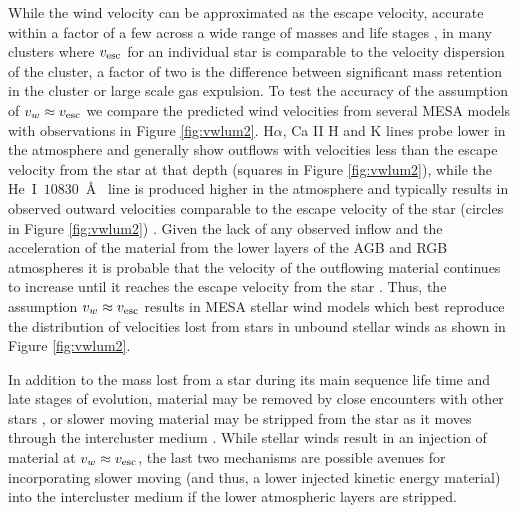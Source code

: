 \documentclass[fleqn,usenatbib]{mnras}
\begin{document}
While the wind velocity can be approximated as the escape velocity, accurate within a factor of a few across a wide range of masses and life stages \citep{abbott1978,evans2004,schaerer1996,nyman1992,vass1993,loup1993,dupree1987,debes2006,badalyan1992}, in many clusters where $v_{\rm esc}$ for an individual star is comparable to the velocity dispersion of the cluster, a factor of two is the difference between significant mass retention in the cluster or large scale gas expulsion.
To test the accuracy of the assumption of $v_w \approx v_{\rm esc}$ we compare the predicted wind velocities from several MESA models with observations 
in Figure \ref{fig:vwlum2}.
H$\alpha$, Ca II H and K lines probe lower in the atmosphere and generally show outflows with velocities less than the escape velocity from the star at 
that depth (squares in Figure \ref{fig:vwlum2}), while the He~I~$10830$~\AA~ line is produced higher in the atmosphere and typically results in observed outward velocities comparable to the escape velocity of the star (circles in Figure \ref{fig:vwlum2}) \citep{dupree1992a,mauas2006,mcdonald2007,dupree2009,meszaros2009,smith2004}.
Given the lack of any observed inflow and the acceleration of the material from the lower layers of the AGB and RGB atmospheres it is probable that the velocity of the outflowing material continues to increase until it reaches the escape velocity from the star \citep{mauas2006}.
Thus, the assumption $v_w \approx v_{\rm esc}$ results in MESA stellar wind models which best reproduce the distribution of velocities lost from stars in unbound stellar winds as shown in Figure \ref{fig:vwlum2}.

 In addition to the mass lost from a star during its main sequence life time and late stages of evolution, material may be removed by close encounters with other stars \citep{pas2014}, or slower moving material may be stripped from the star as it moves through the intercluster medium \citep{wilkin1996}.  While stellar winds result in an injection of material at $v_w \approx v_{\rm esc}$, the last two mechanisms are possible avenues for incorporating slower moving (and thus, a lower injected kinetic energy material) into the intercluster medium if the lower atmospheric layers are stripped. 
\end{document}
